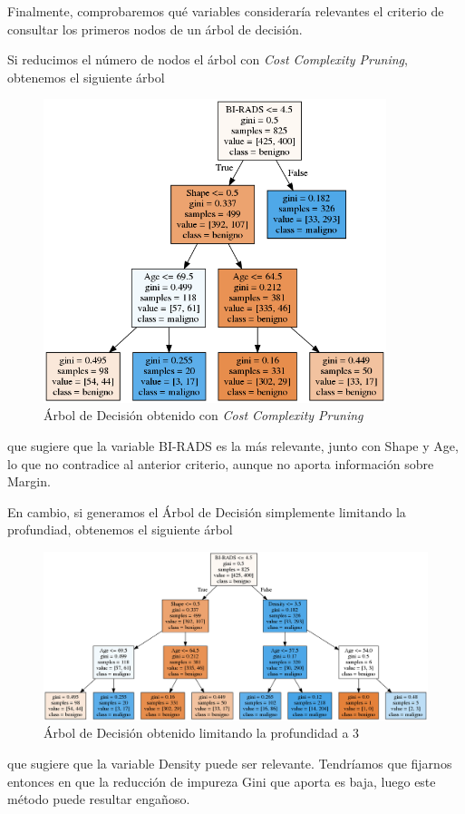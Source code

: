 \documentclass{article}
\begin{document}
  Finalmente, comprobaremos qué variables consideraría relevantes el
  criterio de consultar los primeros nodos de un árbol de decisión.

  Si reducimos el número de nodos el árbol con \emph{Cost Complexity
    Pruning}, obtenemos el siguiente árbol
  \begin{figure}[H]
    \centering
    \includegraphics[width=100mm]{figures/tree_cpp}
    \caption{Árbol de Decisión obtenido con \emph{Cost Complexity
    Pruning}}
\end{figure}

que sugiere que la variable BI-RADS es la más relevante, junto con
Shape y Age, lo que no contradice al anterior criterio, aunque no
aporta información sobre Margin.

En cambio, si generamos el Árbol de Decisión simplemente limitando la
profundiad, obtenemos el siguiente árbol

\begin{figure}[H]
    \centering
    \includegraphics[width=120mm]{figures/tree_depth}
    \caption{Árbol de Decisión obtenido limitando la profundidad a 3}
  \end{figure}
  que sugiere que la variable Density puede ser relevante. Tendríamos
  que fijarnos entonces en que la reducción de impureza Gini que
  aporta es baja, luego este método puede resultar engañoso.
\end{document}
